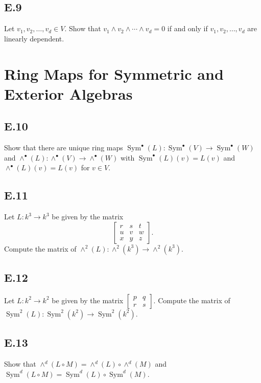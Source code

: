 \documentclass[lang=cn,11pt]{template}
\begin{document}
\subsection*{E.9} Let \( v_1, v_2, \dots, v_d \in V \). Show that \( v_1 \wedge v_2 \wedge \cdots \wedge v_d = 0 \) if and only if \( v_1, v_2, \dots, v_d \) are linearly dependent.

\section{Ring Maps for Symmetric and Exterior Algebras}

\subsection*{E.10} Show that there are unique ring maps \( \operatorname{Sym}^\bullet(L) : \operatorname{Sym}^\bullet(V) \to \operatorname{Sym}^\bullet(W) \) and \( \wedge^\bullet(L) : \wedge^\bullet(V) \to \wedge^\bullet(W) \) with \( \operatorname{Sym}^\bullet(L)(v) = L(v) \) and \( \wedge^\bullet(L)(v) = L(v) \) for \( v \in V \).

\subsection*{E.11} Let \( L : k^3 \to k^3 \) be given by the matrix
\[
\begin{bmatrix} r & s & t \\ u & v & w \\ x & y & z \end{bmatrix}.
\]
Compute the matrix of \( \wedge^2(L) : \wedge^2(k^3) \to \wedge^2(k^3) \).

\subsection*{E.12} Let \( L : k^2 \to k^2 \) be given by the matrix \( \begin{bmatrix} p & q \\ r & s \end{bmatrix} \). Compute the matrix of \( \operatorname{Sym}^2(L) : \operatorname{Sym}^2(k^2) \to \operatorname{Sym}^2(k^2) \).

\subsection*{E.13} Show that \( \wedge^d(L \circ M) = \wedge^d(L) \circ \wedge^d(M) \) and \( \operatorname{Sym}^d(L \circ M) = \operatorname{Sym}^d(L) \circ \operatorname{Sym}^d(M) \).
\end{document}
